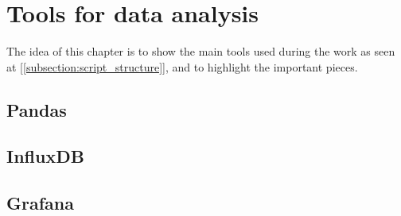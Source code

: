 \chapter{Tools for data analysis}
The idea of this chapter is to show the main tools used during the work as seen at [\ref{subsection:script_structure}], and to highlight the important pieces.
\section{Pandas}

\section{InfluxDB}

\section{Grafana}

